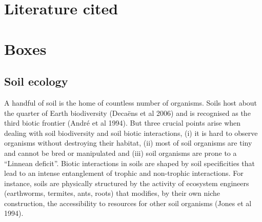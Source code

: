 \section*{Literature cited}\label{literature-cited}



\section*{Boxes}\label{potential-boxes}

\subsection*{Soil ecology}\label{soil-ecology}

A handful of soil is the home of countless number of organisms. Soils host about
the quarter of Earth biodiversity (Decaëns et al 2006) and is recognised as the
third biotic frontier (André et al 1994). But three crucial points arise when
dealing with soil biodiversity and soil biotic interactions, (i) it is hard to
observe organisms without destroying their habitat, (ii) most of soil organisms
are tiny and cannot be bred or manipulated and (iii) soil organisms are prone to
a “Linnean deficit”. Biotic interactions in soils are shaped by soil
specificities that lead to an intense entanglement of trophic and non-trophic
interactions. For instance, soils are physically structured by the activity of
ecosystem engineers (earthworms, termites, ants, roots) that modifies, by their
own niche construction, the accessibility to resources for other soil organisms
(Jones et al 1994).

